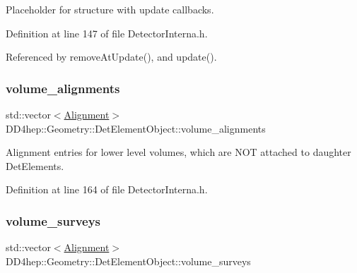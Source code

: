 Placeholder for structure with update callbacks. 



Definition at line 147 of file Detector\+Interna.\+h.



Referenced by remove\+At\+Update(), and update().

\hypertarget{class_d_d4hep_1_1_geometry_1_1_det_element_object_a549c814b4adf2d5897234ccd24186fb1}{}\label{class_d_d4hep_1_1_geometry_1_1_det_element_object_a549c814b4adf2d5897234ccd24186fb1} 
\subsubsection{\texorpdfstring{volume\+\_\+alignments}{volume\_alignments}}
{\footnotesize\ttfamily std\+::vector$<$\hyperlink{class_d_d4hep_1_1_geometry_1_1_det_element_object_aaf1bb49d0e1799f548f775b35e3cb590}{Alignment}$>$ D\+D4hep\+::\+Geometry\+::\+Det\+Element\+Object\+::volume\+\_\+alignments}



Alignment entries for lower level volumes, which are N\+OT attached to daughter Det\+Elements. 



Definition at line 164 of file Detector\+Interna.\+h.

\hypertarget{class_d_d4hep_1_1_geometry_1_1_det_element_object_a7fdbe44b6eee280dc2197b7627c2012e}{}\label{class_d_d4hep_1_1_geometry_1_1_det_element_object_a7fdbe44b6eee280dc2197b7627c2012e} 
\subsubsection{\texorpdfstring{volume\+\_\+surveys}{volume\_surveys}}
{\footnotesize\ttfamily std\+::vector$<$\hyperlink{class_d_d4hep_1_1_geometry_1_1_det_element_object_aaf1bb49d0e1799f548f775b35e3cb590}{Alignment}$>$ D\+D4hep\+::\+Geometry\+::\+Det\+Element\+Object\+::volume\+\_\+surveys}




